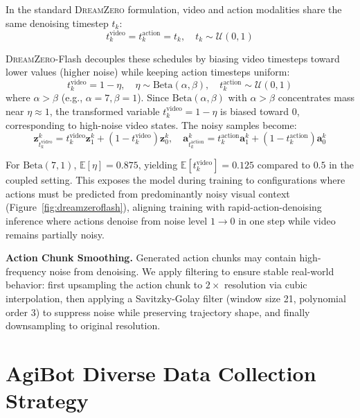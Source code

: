 \documentclass[10pt,logo,copyright]{nvidiatechreport}
\newcommand{\ourmethod}{\mbox{\textsc{DreamZero}}\xspace}
\begin{document}
In the standard \ourmethod formulation, video and action modalities share the same denoising timestep $t_k$:
\begin{equation}
t_k^{\text{video}} = t_k^{\text{action}} = t_k, \quad t_k \sim \mathcal{U}(0, 1)
\end{equation}

\ourmethod-Flash decouples these schedules by biasing video timesteps toward lower values (higher noise) while keeping action timesteps uniform:
\begin{equation}
t_k^{\text{video}} = 1 - \eta, \quad \eta \sim \text{Beta}(\alpha, \beta), \quad t_k^{\text{action}} \sim \mathcal{U}(0, 1)
\end{equation}
where $\alpha > \beta$ (e.g., $\alpha=7, \beta=1$). Since $\text{Beta}(\alpha, \beta)$ with $\alpha > \beta$ concentrates mass near $\eta \approx 1$, the transformed variable $t_k^{\text{video}} = 1 - \eta$ is biased toward 0, corresponding to high-noise video states. The noisy samples become:
\begin{equation}
\mathbf{z}_{t_k^{\text{video}}}^{k} = t_k^{\text{video}} \mathbf{z}_{1}^{k} + (1 - t_k^{\text{video}}) \mathbf{z}_{0}^{k}, \quad
\mathbf{a}_{t_k^{\text{action}}}^{k} = t_k^{\text{action}} \mathbf{a}_{1}^{k} + (1 - t_k^{\text{action}}) \mathbf{a}_{0}^{k}
\end{equation}

For $\text{Beta}(7,1)$, $\mathbb{E}[\eta] = 0.875$, yielding $\mathbb{E}[t_k^{\text{video}}] = 0.125$ compared to $0.5$ in the coupled setting. This exposes the model during training to configurations where actions must be predicted from predominantly noisy visual context (Figure~\ref{fig:dreamzeroflash}), aligning training with rapid-action-denoising inference where actions denoise from noise level $1 \rightarrow 0$ in one step while video remains partially noisy.

\textbf{Action Chunk Smoothing.} Generated action chunks may contain high-frequency noise from denoising. We apply filtering to ensure stable real-world behavior: first upsampling the action chunk to $2\times$ resolution via cubic interpolation, then applying a Savitzky-Golay filter (window size 21, polynomial order 3) to suppress noise while preserving trajectory shape, and finally downsampling to original resolution.

\section{AgiBot Diverse Data Collection Strategy}
\label{appen:agibot_dc}
\end{document}

